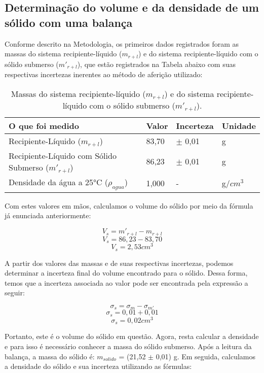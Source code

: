 \subsection{Determinação do volume e da densidade de um sólido com
uma balança}

Conforme descrito na Metodologia, os primeiros dados registrados foram as massas do sistema recipiente-líquido ($m_{r+l}$) e do sistema recipiente-líquido com o sólido submerso  ($m'_{r+l}$), que estão registrados na Tabela abaixo com suas respectivas incertezas inerentes ao método de aferição utilizado:

\begin{table}[H]
    \centering
    \begin{tabular}{ |M{5cm}||M{2cm}||M{2cm}||M{2cm}|  }
        \hline
        \textbf{O que foi medido} & \textbf{Valor} & \textbf{Incerteza} & \textbf{Unidade}\\
        \hline
        Recipiente-Líquido ($m_{r+l}$)         & 83,70    & $\pm$ 0,01 & g\\
        Recipiente-Líquido com Sólido Submerso ($m'_{r+l}$)                     & 86,23     & $\pm$ 0,01 & g\\
        Densidade da água a 25°C ($\rho _{agua}$)           & 1,000 & - & g/$cm^3$\\
        \hline
    \end{tabular}
    \caption{Massas do sistema recipiente-líquido ($m_{r+l}$) e do sistema recipiente-líquido com o sólido submerso  ($m'_{r+l}$).}
\end{table}

Com estes valores em mãos, calculamos o volume do sólido por meio da fórmula já enunciada anteriormente:

\[ V_s = m'_{r+l} - m_{r+l} \]
\[ V_s = 86,23 - 83,70 \]
\[ V_s = 2,53 cm^3 \]

A partir dos valores das massas e de suas respectivas incertezas, podemos determinar a incerteza final do volume encontrado para o sólido. Dessa forma, temos que a incerteza associada ao valor pode ser encontrada pela expressão a seguir:

\[ \sigma_s = \sigma_m - \sigma_{m'} \]
\[ \sigma_s = 0,01 + 0,01 \]
\[ \sigma_s = 0,02 cm^3 \]

Portanto, este é o volume do sólido em questão. Agora, resta calcular a densidade e para isso é necessário conhecer a massa do sólido submerso. Após a leitura da balança, a massa do sólido é: $m_{solido}$ = (21,52 $\pm$ 0,01) g. Em seguida, calculamos a densidade do sólido e sua incerteza utilizando as fórmulas: 

